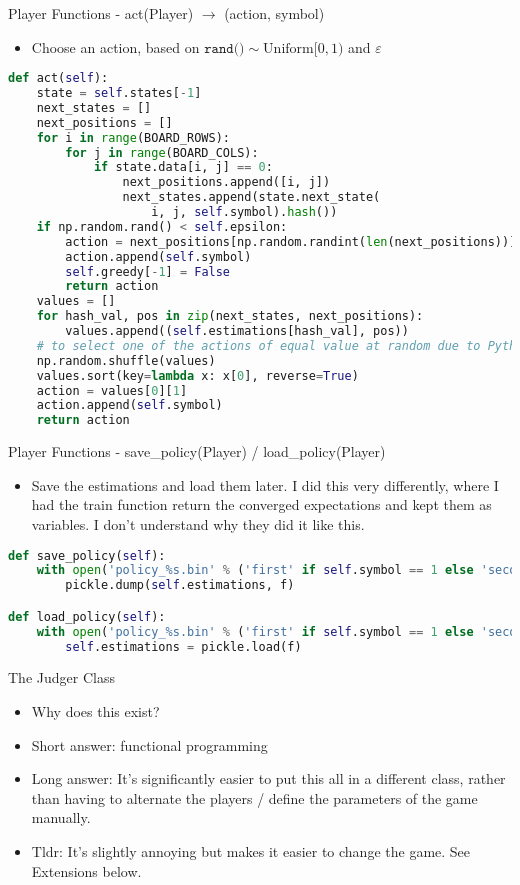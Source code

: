 \documentclass{beamer}
\begin{document}
\begin{frame}[fragile]{Player Functions - act(Player) $\to$ (action, symbol)}
\begin{itemize}
	\item Choose an action, based on $\texttt{rand()}\sim \text{Uniform}[0,1)$ and $\varepsilon$
\end{itemize}
\begin{lstlisting}[language=Python]
def act(self):
    state = self.states[-1]
    next_states = []
    next_positions = []
    for i in range(BOARD_ROWS):
        for j in range(BOARD_COLS):
            if state.data[i, j] == 0:
                next_positions.append([i, j])
                next_states.append(state.next_state(
                    i, j, self.symbol).hash())
    if np.random.rand() < self.epsilon:
        action = next_positions[np.random.randint(len(next_positions))]
        action.append(self.symbol)
        self.greedy[-1] = False
        return action
    values = []
    for hash_val, pos in zip(next_states, next_positions):
        values.append((self.estimations[hash_val], pos))
    # to select one of the actions of equal value at random due to Python's sort is stable
    np.random.shuffle(values)
    values.sort(key=lambda x: x[0], reverse=True)
    action = values[0][1]
    action.append(self.symbol)
    return action
\end{lstlisting}
\end{frame}
\begin{frame}[fragile]{Player Functions - save\_policy(Player) / load\_policy(Player)}
\begin{itemize}
	\item Save the estimations and load them later. I did this very differently, where I had the train function return the converged expectations and kept them as variables. I don't understand why they did it like this.
\end{itemize}
\begin{lstlisting}[language=Python]
def save_policy(self):
    with open('policy_%s.bin' % ('first' if self.symbol == 1 else 'second'), 'wb') as f:
        pickle.dump(self.estimations, f)

def load_policy(self):
    with open('policy_%s.bin' % ('first' if self.symbol == 1 else 'second'), 'rb') as f:
        self.estimations = pickle.load(f)
\end{lstlisting}
\end{frame}
\begin{frame}{The Judger Class}
	\begin{itemize}
		\item Why does this exist?
		\item Short answer: functional programming
		\item Long answer: It's significantly easier to put this all in a different class, rather than having to alternate the players / define the parameters of the game manually. 
		\item Tldr: It's slightly annoying but makes it easier to change the game. See Extensions below.
	\end{itemize}
\end{frame}
\end{document}
